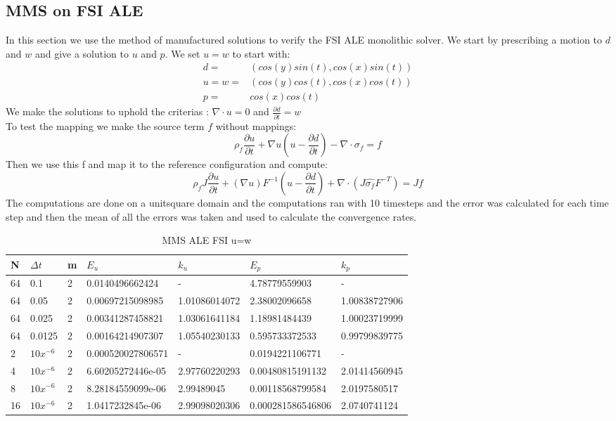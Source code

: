\subsection{MMS on FSI ALE}
In this section we use the method of manufactured solutions to verify the FSI ALE monolithic solver. We start by prescribing a motion to $ d$ and $w$ and give a solution to $u$ and $p$. We set $u = w$ to start with:
\begin{align*}
d =& ( cos(y)sin(t) , cos(x)sin(t) )\\
u = w=& ( cos(y)cos(t), cos(x)cos(t) ) \\
p =& cos(x)cos(t)
\end{align*}
We make the solutions to uphold the criterias : $ \nabla \cdot u =0  $ and $ \frac{\partial d}{\partial t} = w  $ \\

To test the mapping we make the source term $f$ without mappings:
$$ \rho_f \frac{\partial u}{\partial t}  +  \nabla u (u-\frac{\partial d}{\partial t})  -  \nabla \cdot \sigma_f  = f $$
Then we use this f and map it to the reference configuration and compute:
$$ \rho_f J \frac{\partial u}{\partial t} + (\nabla u)F^{-1}(u-\frac{\partial d}{\partial t})  + \nabla \cdot( J \hat{\sigma_f} F^{-T}) = J f$$
The computations are done on a unitsquare domain and the computations ran with 10 timesteps and the error was calculated for each time step and then the mean of all the errors was taken and used to calculate the convergence rates.
\begin{table}[h!]
\centering
\caption{MMS ALE FSI u=w}
\label{my-label}
\begin{tabular}{|l|l|l|l|l|l|l|}
\hline
N & $\Delta t$ & m & $E_u$ & $k_u$ & $E_p$ & $k_p$ \\ \hline
64 & 0.1 & 2 & 0.0140496662424 & - & 4.78779559903 & - \\ \hline
64 & 0.05 & 2 & 0.00697215098985 & 1.01086014072 & 2.38002096658 & 1.00838727906 \\ \hline
64 & 0.025 & 2 & 0.00341287458821 & 1.03061641184 & 1.18981484439 & 1.00023719999 \\ \hline
64 & 0.0125 & 2 & 0.00164214907307 & 1.05540230133 & 0.595733372533 & 0.99799839775 \\ \hline
2 & $10x^{-6}$ & 2 & 0.000520027806571 & - & 0.0194221106771 & - \\ \hline
4 & $10x^{-6}$ & 2 & 6.60205272446e-05 & 2.97760220293 & 0.00480815191132 & 2.01414560945 \\ \hline
8 & $10x^{-6}$ & 2 & 8.28184559099e-06 & 2.99489045 & 0.00118568799584 & 2.0197580517 \\ \hline
16 & $10x^{-6}$ & 2 & 1.0417232845e-06 & 2.99098020306 & 0.000281586546806 & 2.0740741124 \\ \hline
\end{tabular}
\end{table}

